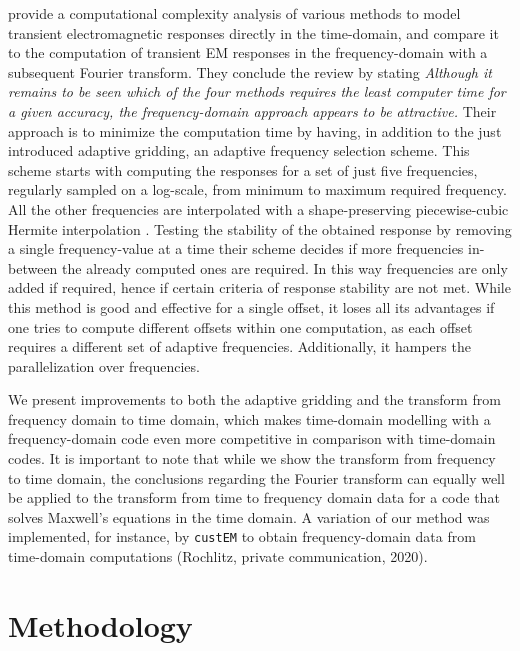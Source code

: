 \documentclass[
    manuscript,
  ]{geophysics}
\newcommand{\custem}{\texttt{custEM}\xspace}
\begin{document}
\cite{GEO.08.Mulder} provide a computational complexity analysis of various
methods to model transient electromagnetic responses directly in the
time-domain, and compare it to the computation of transient EM responses in the
frequency-domain with a subsequent Fourier transform. They conclude the review
by stating \emph{\guillemotleft Although it remains to be seen which of the
four methods requires the least computer time for a given accuracy, the
frequency-domain approach appears to be attractive.\guillemotright} Their
approach is to minimize the computation time by having, in addition to the just
introduced adaptive gridding, an adaptive frequency selection scheme. This
scheme starts with computing the responses for a set of just five frequencies,
regularly sampled on a log-scale, from minimum to maximum required frequency.
All the other frequencies are interpolated with a shape-preserving
piecewise-cubic Hermite interpolation \citep[PCHIP, ][]{SIAM.80.Fritsch}.
Testing the stability of the obtained response by removing a single
frequency-value at a time their scheme decides if more frequencies in-between
the already computed ones are required. In this way frequencies are only added
if required, hence if certain criteria of response stability are not met. While
this method is good and effective for a single offset, it loses all its
advantages if one tries to compute different offsets within one computation, as
each offset requires a different set of adaptive frequencies. Additionally, it
hampers the parallelization over frequencies.

We present improvements to both the adaptive gridding and the transform from
frequency domain to time domain, which makes time-domain modelling with a
frequency-domain code even more competitive in comparison with time-domain
codes. It is important to note that while we show the transform from frequency
to time domain, the conclusions regarding the Fourier transform can equally
well be applied to the transform from time to frequency domain data for a code
that solves Maxwell's equations in the time domain. A variation of our method
was implemented, for instance, by \custem \citep{GEO.19.Rochlitz} to obtain
frequency-domain data from time-domain computations (Rochlitz, private
communication, 2020).

\section{Methodology}
\end{document}
